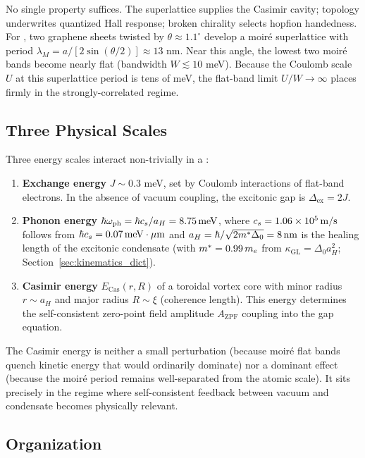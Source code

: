 \documentclass[11pt,letterpaper]{article}
\begin{document}
No single property suffices. The superlattice supplies the Casimir cavity; topology underwrites quantized Hall response; broken chirality selects hopfion handedness. For \MATBG, two graphene sheets twisted by $\theta \approx 1.1^\circ$ develop a moiré superlattice with period $\lambda_M = a/[2\sin(\theta/2)] \approx 13$ nm. Near this angle, the lowest two moiré bands become nearly flat (bandwidth $W \lesssim 10$ meV). Because the Coulomb scale $U$ at this superlattice period is tens of meV, the flat-band limit $U/W \to \infty$ places \MATBG{} firmly in the strongly-correlated regime\cite{Andrei2020,Balents2020}.

\subsection{Three Physical Scales}

Three energy scales interact non-trivially in a \TEVC{}:

\begin{enumerate}
    \item \textbf{Exchange energy} $J \sim 0.3$ meV, set by Coulomb interactions of flat-band electrons. In the absence of vacuum coupling, the excitonic gap is $\Delta_{\text{ex}} = 2J$.
    \item \textbf{Phonon energy} $\hbar\omega_{\text{ph}} = \hbar c_s / a_H =8.75\,\mathrm{meV}$, where $c_s=1.06\times 10^{5}\,\mathrm{m/s}$ follows from $\hbar c_s=0.07\,\mathrm{meV\cdot\mu m}$ and $a_H = \hbar/\sqrt{2m^*\Delta_0} =8\,\mathrm{nm}$ is the healing length of the excitonic condensate (with $m^* =0.99\,m_e$ from $\kappa_{\mathrm{GL}}=\Delta_0 a_H^2$; Section~\ref{sec:kinematics_dict}).
    \item \textbf{Casimir energy} $E_{\text{Cas}}(r,R)$ of a toroidal vortex core with minor radius $r \sim a_H$ and major radius $R \sim \xi$ (coherence length). This energy determines the self-consistent zero-point field amplitude $A_{\text{ZPF}}$ coupling into the gap equation.
\end{enumerate}

The Casimir energy is neither a small perturbation (because moiré flat bands quench kinetic energy that would ordinarily dominate) nor a dominant effect (because the moiré period remains well-separated from the atomic scale). It sits precisely in the regime where self-consistent feedback between vacuum and condensate becomes physically relevant.

\subsection{Organization}
\end{document}
